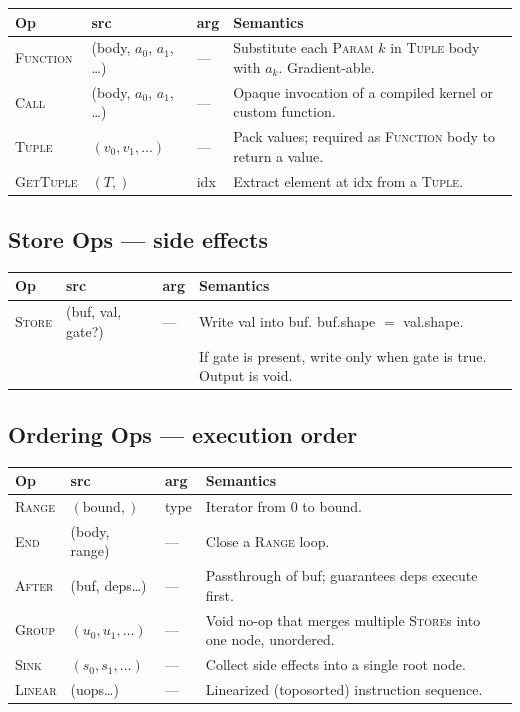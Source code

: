 \documentclass[10pt,letterpaper]{article}
\newcommand{\op}[1]{\textsc{#1}}
\begin{document}
\begin{tabular}{@{}l l l l@{}}
\toprule
\textbf{Op} & \textbf{src} & \textbf{arg} & \textbf{Semantics} \\
\midrule
\op{Function} & (body, $a_0$, $a_1$, \ldots) & --- & Substitute each \op{Param} $k$ in \op{Tuple} body with $a_k$. Gradient-able. \\
\op{Call} & (body, $a_0$, $a_1$, \ldots) & --- & Opaque invocation of a compiled kernel or custom function. \\
\op{Tuple} & $(v_0, v_1, \ldots)$ & --- & Pack values; required as \op{Function} body to return a value. \\
\op{GetTuple} & $(T,)$ & idx & Extract element at idx from a \op{Tuple}. \\
\bottomrule
\end{tabular}

\subsection*{{\color{multipurple}Store Ops} \normalfont\small--- side effects}

\begin{tabular}{@{}l l l l@{}}
\toprule
\textbf{Op} & \textbf{src} & \textbf{arg} & \textbf{Semantics} \\
\midrule
\op{Store} & (buf, val, gate?) & --- & Write val into buf. buf.shape $=$ val.shape. \\
  & & & If gate is present, write only when gate is true. Output is void. \\
\bottomrule
\end{tabular}

\subsection*{{\color{assignbrown}Ordering Ops} \normalfont\small--- execution order}

\begin{tabular}{@{}l l l p{6.0cm}@{}}
\toprule
\textbf{Op} & \textbf{src} & \textbf{arg} & \textbf{Semantics} \\
\midrule
\op{Range} & $(\text{bound},)$ & type & Iterator from $0$ to bound. \\
\op{End} & (body, range) & --- & Close a \op{Range} loop. \\
\op{After} & (buf, deps\ldots) & --- & Passthrough of buf; guarantees deps execute first. \\
\op{Group} & $(u_0, u_1, \ldots)$ & --- & Void no-op that merges multiple \op{Store}s into one node, unordered. \\
\op{Sink} & $(s_0, s_1, \ldots)$ & --- & Collect side effects into a single root node. \\
\op{Linear} & (uops\ldots) & --- & Linearized (toposorted) instruction sequence. \\
\bottomrule
\end{tabular}
\end{document}
